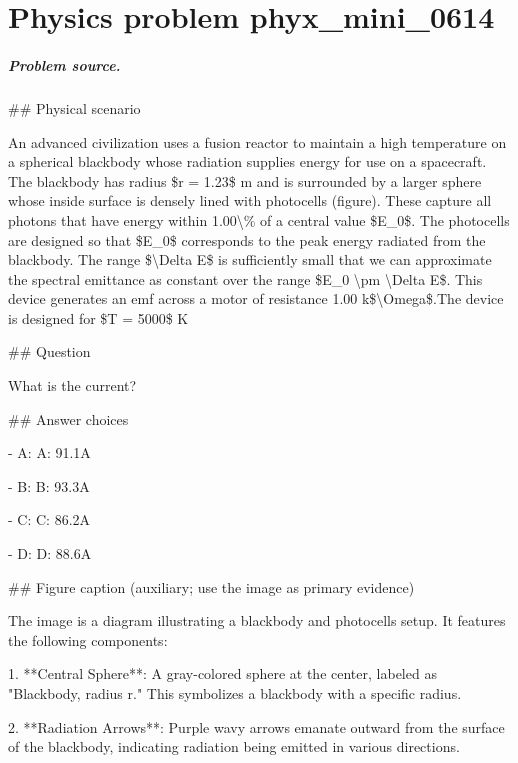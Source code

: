 
\chapter{Physics problem phyx\_mini\_0614}
\label{ch:PhyXMiniProblems_problem_phyx_mini_0614}

\paragraph{Problem source.}
\#\# Physical scenario

An advanced civilization uses a fusion reactor to maintain a high temperature on a spherical blackbody whose radiation supplies energy for use on a spacecraft. The blackbody has radius \$r = 1.23\$ m and is surrounded by a larger sphere whose inside surface is densely lined with photocells (figure). These capture all photons that have energy within 1.00\textbackslash{}\% of a central value \$E\_0\$. The photocells are designed so that \$E\_0\$ corresponds to the peak energy radiated from the blackbody. The range \$\textbackslash{}Delta E\$ is sufficiently small that we can approximate the spectral emittance as constant over the range \$E\_0 \textbackslash{}pm \textbackslash{}Delta E\$. This device generates an emf across a motor of resistance 1.00 k\$\textbackslash{}Omega\$.The device is designed for \$T = 5000\$ K

\#\# Question

What is the current?

\#\# Answer choices

- A: A: 91.1A

- B: B: 93.3A

- C: C: 86.2A

- D: D: 88.6A

\#\# Figure caption (auxiliary; use the image as primary evidence)

The image is a diagram illustrating a blackbody and photocells setup. It features the following components:

1. **Central Sphere**: A gray-colored sphere at the center, labeled as "Blackbody, radius r." This symbolizes a blackbody with a specific radius.

2. **Radiation Arrows**: Purple wavy arrows emanate outward from the surface of the blackbody, indicating radiation being emitted in various directions.

